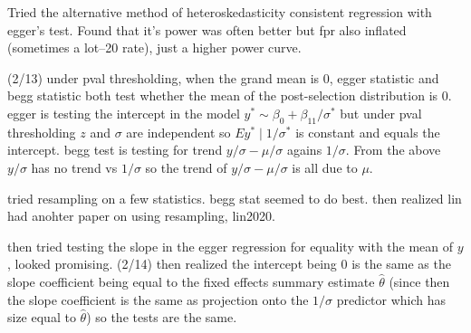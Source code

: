\documentclass{article}
\newcommand{\sel}[1]{#1^*}
\begin{document}
Tried the alternative method of heteroskedasticity consistent
regression with egger's test. Found that it's power was often better
but fpr also inflated (sometimes a lot--20%
rate), just a higher power curve.


(2/13) under pval thresholding, when the grand mean is 0, egger
statistic and begg statistic both test whether the mean of the
post-selection distribution is 0. egger is testing the intercept in
the model $\sel{y} \sim \beta_0 + \beta_1\sel{1/\sigma}$ but under pval
thresholding $z$ and $\sigma$ are independent so
$E\sel{y}\mid\sel{1/\sigma}$ is constant and equals the
intercept. begg test is testing for trend $y/\sigma - \mu/\sigma$
agains $1/\sigma$. From the above $y/\sigma$ has no trend vs
$1/\sigma$ so the trend of $y/\sigma - \mu/\sigma$ is all due to
$\mu$.

tried resampling on a few statistics. begg stat seemed to do
best. then realized lin had anohter paper on using resampling,
lin2020.

then tried testing the slope in the egger regression for equality with
the mean of $y$, looked promising. (2/14) then realized the intercept
being 0 is the same as the slope coefficient being equal to the fixed
effects summary estimate $\hat\theta$ (since then the slope
coefficient is the same as projection onto the $1/\sigma$ predictor
which has size equal to $\hat\theta$) so the tests are the same.
\end{document}
